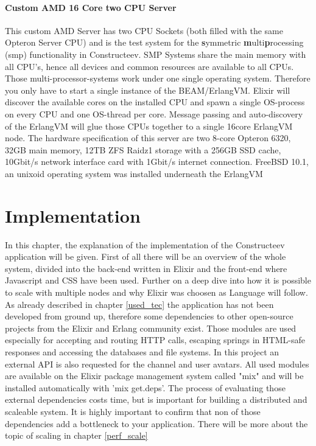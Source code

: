\subsubsection{Custom AMD 16 Core two CPU Server} 
This custom AMD Server has two CPU Sockets (both filled with the same Opteron Server CPU) and is the test system for the \textbf{s}ymmetric \textbf{m}ulti\textbf{p}rocessing (smp) functionality in Constructeev. SMP Systems share the main memory with all CPU's, hence all devices and common resources are available to all CPUs. Those multi-processor-systems work under one single operating system. Therefore you only have to start a single instance of the BEAM/ErlangVM. Elixir will discover the available cores on the installed CPU and spawn a single OS-process on every CPU and one OS-thread per core. Message passing and auto-discovery of the ErlangVM will glue those CPUs together to a single 16core ErlangVM node. The hardware specification of this server are two 8-core Opteron 6320, 32GB main memory, 12TB ZFS Raidz1 storage with a 256GB SSD cache, 10Gbit/s network interface card with 1Gbit/s internet connection. FreeBSD 10.1, an unixoid operating system was installed underneath the ErlangVM


\chapter{Implementation}
In this chapter, the explanation of the implementation of the Constructeev application will be given. First of all there will be an overview of the whole system, divided into the back-end written in Elixir and the front-end where Javascript and CSS have been used. 
Further on a deep dive into how it is possible to scale with multiple nodes \textcolor{newcode}{ and why Elixir was choosen as Language} will follow.
As already described in chapter \ref{used_tec} the application has not been developed from ground up, therefore some dependencies to other open-source projects from the Elixir and Erlang community exist. Those modules are used especially for accepting and routing HTTP calls, escaping springs in HTML-safe responses and accessing the databases and file systems. In this project an external API is also requested for the channel and user avatars. All used modules are available on the Elixir package management system called "mix" and will be installed automatically with 'mix get.deps'. The process of evaluating those external dependencies costs time, but is important for building a distributed and scaleable system. It is highly important to confirm that non of those dependencies add a bottleneck to your application. There will be more  about the topic of scaling in chapter \ref{perf_scale}

